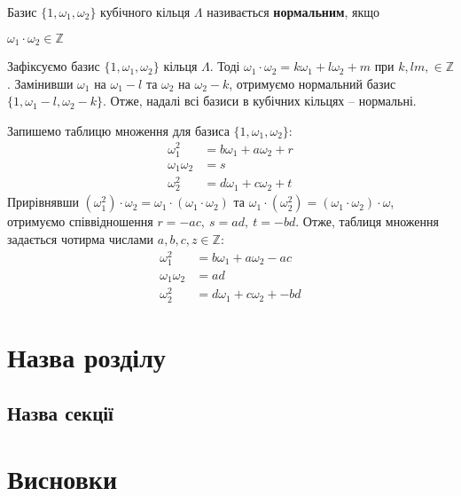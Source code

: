 \documentclass{thesis}
\begin{document}
\begin{definition}
Базис $\{1,\omega_1,\omega_2\}$ кубічного кільця $\Lambda$ називається \textbf{нормальним}, якщо
\begin{center}
$\omega_1 \cdot \omega_2 \in \mathbb{Z}$
\end{center}
\end{definition}

Зафіксуємо базис $\{1,\omega_1,\omega_2\}$ кільця $\Lambda$. Тоді $\omega_1 \cdot \omega_2 = k \omega_1 + l \omega_2 + m$ при $k,lm, \in \mathbb{Z}$. Замінивши $\omega_1$ на $\omega_1-l$ та $\omega_2$ на $\omega_2 - k$, отримуємо нормальний базис $\{1,\omega_1 - l, \omega_2 - k\}$. Отже, надалі всі базиси в кубічних кільцях -- нормальні.

Запишемо таблицю множення для базиса $\{1,\omega_1,\omega_2\}$:
\begin{align*}
\omega_1^2 & = b \omega_1 + a \omega_2 + r \\
\omega_1 \omega_2 & = s \\
\omega_2^2 & = d \omega_1 + c \omega_2 + t
\end{align*}
Прирівнявши $(\omega_1^2) \cdot \omega_2 = \omega_1 \cdot (\omega_1 \cdot \omega_2)$ та $\omega_1 \cdot (\omega_2^2) = (\omega_1 \cdot \omega_2) \cdot \omega$, отримуємо співвідношення $r = -ac,\ s = ad,\ t = -bd$. Отже, таблиця множення задається чотирма числами $a,b,c,z \in \mathbb{Z}$:
\begin{align*}
\omega_1^2 & = b \omega_1 + a \omega_2 - ac \\
\omega_1 \omega_2 & = ad \\
\omega_2^2 & = d \omega_1 + c \omega_2 + -bd
\end{align*}
\newpage

\chapter{Назва розділу}\label{chaper2}

\section{Назва секції}\label{section2.1}


\newpage

\chapter*{Висновки}
\end{document}
